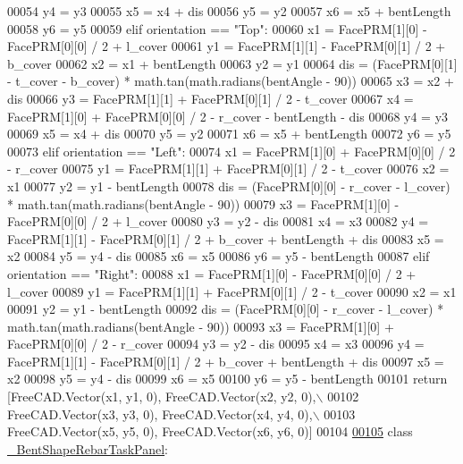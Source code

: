 \begin{DoxyCode}
00054         y4 = y3
00055         x5 = x4 + dis
00056         y5 = y2
00057         x6 = x5 + bentLength
00058         y6 = y5
00059     \textcolor{keywordflow}{elif} orientation == \textcolor{stringliteral}{"Top"}:
00060         x1 = FacePRM[1][0] - FacePRM[0][0] / 2 + l\_cover
00061         y1 = FacePRM[1][1] - FacePRM[0][1] / 2 + b\_cover
00062         x2 = x1 + bentLength
00063         y2 = y1
00064         dis = (FacePRM[0][1] - t\_cover - b\_cover) * math.tan(math.radians(bentAngle - 90))
00065         x3 = x2 + dis
00066         y3 = FacePRM[1][1] + FacePRM[0][1] / 2 - t\_cover
00067         x4 = FacePRM[1][0] + FacePRM[0][0] / 2 - r\_cover - bentLength - dis
00068         y4 = y3
00069         x5 = x4 + dis
00070         y5 = y2
00071         x6 = x5 + bentLength
00072         y6 = y5
00073     \textcolor{keywordflow}{elif} orientation == \textcolor{stringliteral}{"Left"}:
00074         x1 = FacePRM[1][0] + FacePRM[0][0] / 2 - r\_cover
00075         y1 = FacePRM[1][1] + FacePRM[0][1] / 2 - t\_cover
00076         x2 = x1
00077         y2 = y1 - bentLength
00078         dis = (FacePRM[0][0] - r\_cover - l\_cover) * math.tan(math.radians(bentAngle - 90))
00079         x3 = FacePRM[1][0] - FacePRM[0][0] / 2 + l\_cover
00080         y3 = y2 - dis
00081         x4 = x3
00082         y4 = FacePRM[1][1] - FacePRM[0][1] / 2 + b\_cover + bentLength + dis
00083         x5 = x2
00084         y5 = y4 - dis
00085         x6 = x5
00086         y6 = y5 - bentLength
00087     \textcolor{keywordflow}{elif} orientation == \textcolor{stringliteral}{"Right"}:
00088         x1 = FacePRM[1][0] - FacePRM[0][0] / 2 + l\_cover
00089         y1 = FacePRM[1][1] + FacePRM[0][1] / 2 - t\_cover
00090         x2 = x1
00091         y2 = y1 - bentLength
00092         dis = (FacePRM[0][0] - r\_cover - l\_cover) * math.tan(math.radians(bentAngle - 90))
00093         x3 = FacePRM[1][0] + FacePRM[0][0] / 2 - r\_cover
00094         y3 = y2 - dis
00095         x4 = x3
00096         y4 = FacePRM[1][1] - FacePRM[0][1] / 2 + b\_cover + bentLength + dis
00097         x5 = x2
00098         y5 = y4 - dis
00099         x6 = x5
00100         y6 = y5 - bentLength
00101     \textcolor{keywordflow}{return} [FreeCAD.Vector(x1, y1, 0), FreeCAD.Vector(x2, y2, 0),\(\backslash\)
00102            FreeCAD.Vector(x3, y3, 0), FreeCAD.Vector(x4, y4, 0),\(\backslash\)
00103            FreeCAD.Vector(x5, y5, 0), FreeCAD.Vector(x6, y6, 0)]
00104 
\hypertarget{BentShapeRebar_8py_source.tex_l00105}{}\hyperlink{classBentShapeRebar_1_1__BentShapeRebarTaskPanel}{00105} \textcolor{keyword}{class }\hyperlink{classBentShapeRebar_1_1__BentShapeRebarTaskPanel}{\_BentShapeRebarTaskPanel}:

\end{DoxyCode}
